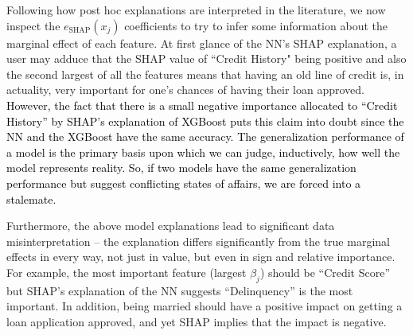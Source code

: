 \documentclass[mnsc,blindrev]{informs3}
\newcommand{\mM}{\mathcal{M}}
\begin{document}
 Following how post hoc explanations are interpreted in the literature, we now inspect the $e_\text{SHAP}(x_j)$ coefficients to try to infer some information about the marginal effect of each feature. At first glance of the NN's SHAP explanation, a user may adduce that the SHAP value of ``Credit History" being positive and also the second largest of all the features means that having an old line of credit is, in actuality, very important for one's chances of having their loan approved. \textcolor{black}{However, the fact that there is a small negative importance allocated to ``Credit History'' by SHAP's explanation of XGBoost puts this claim into doubt since the NN and the XGBoost have the same accuracy. %
 The generalization performance of a model is the primary basis upon which we can judge, inductively, how well the model represents reality. So, if two models have the same generalization performance but suggest conflicting states of affairs, we are forced into a stalemate.}
 


Furthermore, the above model explanations lead to significant data misinterpretation -- the  explanation differs significantly from the true marginal effects in every way, not just in value, but even in sign and relative importance. For example, the most important feature (largest $\beta_j$) should be ``Credit Score'' but SHAP's explanation of the NN suggests ``Delinquency'' is the most important. In addition, being married should have a positive impact on getting a loan application approved, and yet SHAP implies that the impact is negative. %
\end{document}
